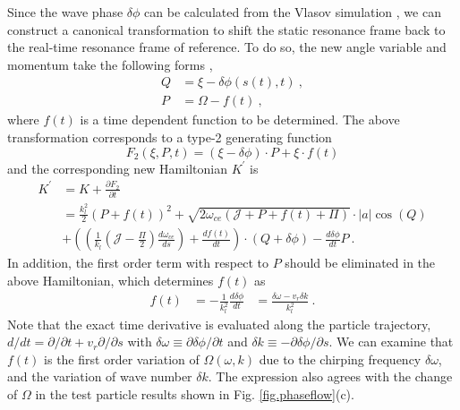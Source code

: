 Since the wave phase $\delta \phi$ can be calculated from the Vlasov simulation
 \cite{zheng2024}, we can construct a canonical transformation to shift the static resonance frame back to the real-time resonance frame of reference.
To do so, the new angle variable and momentum  take the following forms \cite{berk1999},
\begin{equation}
    \begin{aligned}
        Q &= \xi - \delta \phi(s(t),t)~,
        \\
        P & = \Omega - f(t)~,
    \end{aligned}
\end{equation}
where $f(t)$ is a time dependent function to be determined.
The above transformation corresponds to a type-2 generating function
\begin{equation}
    F_2(\xi,P,t) = (\xi - \delta \phi) \cdot P + \xi \cdot f(t)
\end{equation}
and the corresponding new Hamiltonian $K^\prime$ is
\begin{equation}
    \begin{aligned}
        K^\prime & = K + \frac{\partial F_2}{\partial t}
        \\
        & = \frac{k_l^2}{2}(P+f(t))^2 + \sqrt{2\omega_{ce}(\mathcal{J}+P+f(t)+\Pi)} \cdot |a|\cos(Q) 
        \\
        & + ((\frac{1}{k_l}(\mathcal{J} - \frac{\Pi}{2}) \frac{d\omega_{ce}}{ds})  +\frac{d f(t)}{d t} )\cdot(Q + \delta \phi)  - \frac{d \delta \phi}{d t} P ~. 
        \end{aligned}
\end{equation}
In addition,  the first order term with respect to $P$ 
should be eliminated
in the above Hamiltonian, which determines $f(t)$ as
\begin{equation}\label{eq.ft}
    \begin{aligned}
    f(t) & = - \frac{1}{k_l^2} \frac{d \delta \phi}{d t}  &= \frac{\delta \omega - v_r \delta k}{k_l^2}~.
    \end{aligned}
\end{equation} 
Note that the exact time derivative is evaluated along the particle trajectory, $d/dt = \partial/\partial t + v_r \partial /\partial s$ with $\delta \omega  \equiv \partial \delta \phi/\partial t$ and $\delta k  \equiv -\partial \delta \phi/\partial s$.
We can examine that $f(t)$ is the first order variation of $\Omega(\omega,k)$ due to the chirping frequency $\delta \omega$, and the variation of wave number $\delta k$.
The expression also agrees with the change of $\Omega$ in the test particle results shown in Fig. \ref{fig.phaseflow}(c).
